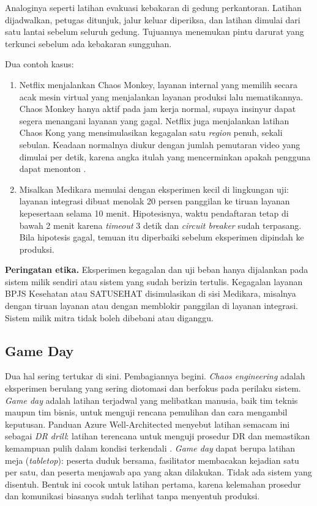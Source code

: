 Analoginya seperti latihan evakuasi kebakaran di gedung perkantoran. Latihan dijadwalkan, petugas
ditunjuk, jalur keluar diperiksa, dan latihan dimulai dari satu lantai sebelum seluruh gedung.
Tujuannya menemukan pintu darurat yang terkunci sebelum ada kebakaran sungguhan.

Dua contoh kasus:
\begin{enumerate}
  \item Netflix menjalankan Chaos Monkey, layanan internal yang memilih secara acak mesin virtual
        yang menjalankan layanan produksi lalu mematikannya. Chaos Monkey hanya aktif pada jam
        kerja normal, supaya insinyur dapat segera menangani layanan yang gagal. Netflix juga
        menjalankan latihan Chaos Kong yang mensimulasikan kegagalan satu \textit{region} penuh,
        sekali sebulan. Keadaan normalnya diukur dengan jumlah pemutaran video yang dimulai per
        detik, karena angka itulah yang mencerminkan apakah pengguna dapat menonton
        \cite{c12-basiri2016}.
  \item Misalkan Medikara memulai dengan eksperimen kecil di lingkungan uji: layanan integrasi
        dibuat menolak 20 persen panggilan ke tiruan layanan kepesertaan selama 10 menit.
        Hipotesisnya, waktu pendaftaran tetap di bawah 2 menit karena \textit{timeout} 3 detik dan
        \textit{circuit breaker} sudah terpasang. Bila hipotesis gagal, temuan itu diperbaiki
        sebelum eksperimen dipindah ke produksi.
\end{enumerate}

\textbf{Peringatan etika.} Eksperimen kegagalan dan uji beban hanya dijalankan pada sistem milik
sendiri atau sistem yang sudah berizin tertulis. Kegagalan layanan BPJS Kesehatan atau SATUSEHAT
disimulasikan di sisi Medikara, misalnya dengan tiruan layanan atau dengan memblokir panggilan di
layanan integrasi. Sistem milik mitra tidak boleh dibebani atau diganggu.

\subsection{Game Day}

Dua hal sering tertukar di sini. Pembagiannya begini. \textit{Chaos engineering} adalah eksperimen
berulang yang sering diotomasi dan berfokus pada perilaku sistem. \textit{Game day} adalah latihan
terjadwal yang melibatkan manusia, baik tim teknis maupun tim bisnis, untuk menguji rencana
pemulihan dan cara mengambil keputusan. Panduan Azure Well-Architected menyebut latihan semacam ini
sebagai \textit{DR drill}: latihan terencana untuk menguji prosedur DR dan memastikan kemampuan
pulih dalam kondisi terkendali \cite{c12-azure-dr}. \textit{Game day} dapat berupa latihan meja
(\textit{tabletop}): peserta duduk bersama, fasilitator membacakan kejadian satu per satu, dan
peserta menjawab apa yang akan dilakukan. Tidak ada sistem yang disentuh. Bentuk ini cocok untuk
latihan pertama, karena kelemahan prosedur dan komunikasi biasanya sudah terlihat tanpa menyentuh
produksi.

